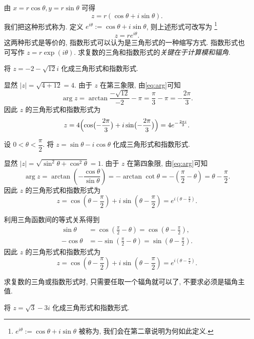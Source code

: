 由 $x=r\cos\theta,y=r\sin\theta$ 可得
  \[z=r(\cos\theta+i\sin\theta).\]
我们把这种形式称为.
定义 \emph{$e^{i\theta}:=\cos\theta+i\sin\theta$}, 则上述形式可改写为%
  \footnote{%
    $e^{i\theta}:=\cos\theta+i\sin\theta$ 被称为, 我们会在第二章说明为何如此定义.
  }%
  \[z=re^{i\theta}.\]
这两种形式是等价的, 指数形式可以认为是三角形式的一种缩写方式.
指数形式也可写作 $z=r\exp(i\theta)$.
求复数的三角和指数形式的\emph{关键在于计算模和辐角}.

\begin{example}
  将 $z=-2-\sqrt{12}i$ 化成三角形式和指数形式.
\end{example}

\begin{solution}
  显然 $|z|=\sqrt{4+12}=4$.
  由于 $z$ 在第三象限, 由\eqref{eq:arg}可知
    \[\arg z=\arctan\frac{-\sqrt{12}}{-2}-\pi=\frac\pi3-\pi=-\frac{2\pi}3.\]
  因此 $z$ 的三角形式和指数形式为
    \[z=4\Bigl(\cos\bigl(-\frac{2\pi}3\bigr)+i\sin\bigl(-
    \frac{2\pi}3\bigr)\Bigr)=4e^{-\frac{2\pi i}3}.\]
\end{solution}

\begin{example}
  设 $0<\theta<\dfrac\pi2$. 将 $z=\sin\theta-i\cos\theta$ 化成三角形式和指数形式.
\end{example}
\begin{solution}
  显然 $|z|=\sqrt{\sin^2\theta+\cos^2\theta}=1$. 由于 $z$ 在第四象限, 由\eqref{eq:arg}可知
  \[\arg z=\arctan(-\frac{\cos\theta}{\sin\theta})=-\arctan\cot\theta=-(\frac\pi2-\theta)=\theta-\frac\pi2.\]
  因此 $z$ 的三角形式和指数形式为
  \[z=\displaystyle\cos(\theta-\frac\pi2)+i\sin(\theta-\frac\pi2)=e^{i(\theta-\frac\pi2)}.\]
\end{solution}
\begin{solution}[另解]
  利用三角函数间的等式关系得到
  \begin{align*}
    \sin\theta&=\cos(\frac\pi2-\theta)=\cos(\theta-\frac\pi2),\\
    -\cos\theta&=-\sin(\frac\pi2-\theta)=\sin(\theta-\frac\pi2).
  \end{align*}
  因此 $z$ 的三角形式和指数形式为
  \[z=\displaystyle\cos(\theta-\frac\pi2)+i\sin(\theta-\frac\pi2)=e^{i(\theta-\frac\pi2)}.\]
\end{solution}

求复数的三角或指数形式时, 只需要任取一个辐角就可以了, 不要求必须是辐角主值.

\begin{exercise}
  将 $z=\sqrt 3-3i$ 化成三角形式和指数形式.
\end{exercise}

